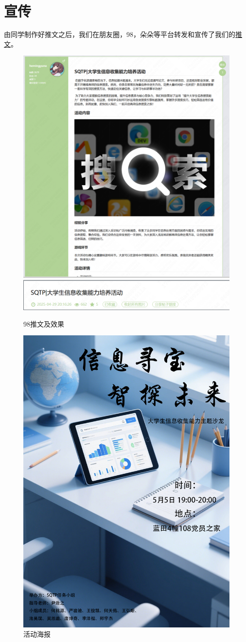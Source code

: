\section{宣传}
由同学制作好推文之后，我们在朋友圈，98，朵朵等平台转发和宣传了我们的\href{https://v.xiumi.us/board/v5/70Xhf/619220060}{推文}。
\begin{figure}[H]
\centering
\includegraphics[width=.8\textwidth]{./figures/电脑端推文.png}
\includegraphics[width=.8\textwidth]{./figures/98宣传.png}
\caption{98推文及效果}
\end{figure}
\begin{figure}[H]
\centering
\includegraphics[width=.7\textwidth]{./resource/沙龙海报 .jpg}
\caption{活动海报}
\end{figure}
